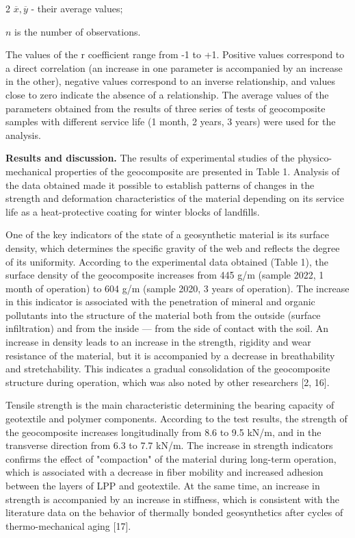 \begin{multicols}{2}
\(\overline{x},\overline{y}\) - their average values;

\(n\) is the number of observations.

The values of the r coefficient range from -1 to +1.
Positive values correspond to a direct correlation (an increase in one
parameter is accompanied by an increase in the other), negative values
correspond to an inverse relationship, and values close to zero indicate
the absence of a relationship. The average values of the parameters
obtained from the results of three series of tests of geocomposite
samples with different service life (1 month, 2 years, 3 years) were
used for the analysis.

{\bfseries Results and discussion.} The results of experimental studies of
the physico-mechanical properties of the geocomposite are presented in
Table 1. Analysis of the data obtained made it possible to establish
patterns of changes in the strength and deformation characteristics of
the material depending on its service life as a heat-protective coating
for winter blocks of landfills.

One of the key indicators of the state of a geosynthetic material is its
surface density, which determines the specific gravity of the web and
reflects the degree of its uniformity. According to the experimental
data obtained (Table 1), the surface density of the geocomposite
increases from 445 g/m (sample 2022, 1 month of
operation) to 604 g/m (sample 2020, 3 years of
operation). The increase in this indicator is associated with the
penetration of mineral and organic pollutants into the structure of the
material both from the outside (surface infiltration) and from the
inside --- from the side of contact with the soil. An increase in
density leads to an increase in the strength, rigidity and wear
resistance of the material, but it is accompanied by a decrease in
breathability and stretchability. This indicates a gradual consolidation
of the geocomposite structure during operation, which was also noted by
other researchers {[}2, 16{]}.

Tensile strength is the main characteristic determining the bearing
capacity of geotextile and polymer components. According to the test
results, the strength of the geocomposite increases longitudinally from
8.6 to 9.5 kN/m, and in the transverse direction from 6.3 to 7.7 kN/m.
The increase in strength indicators confirms the effect of "compaction"
of the material during long-term operation, which is associated with a
decrease in fiber mobility and increased adhesion between the layers of
LPP and geotextile. At the same time, an increase in strength is
accompanied by an increase in stiffness, which is consistent with the
literature data on the behavior of thermally bonded geosynthetics after
cycles of thermo-mechanical aging {[}17{]}.


\end{multicols}
